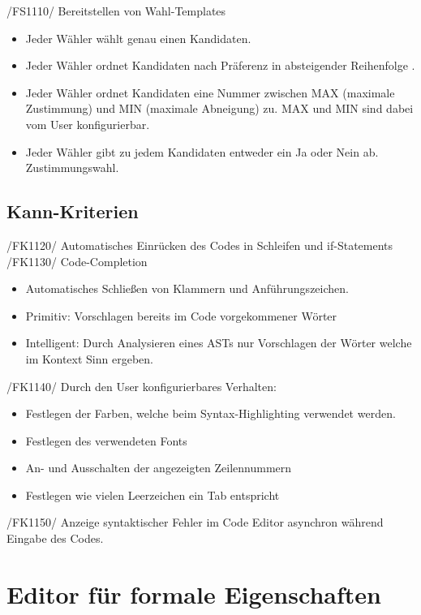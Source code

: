 \documentclass[a4paper]{scrreprt}
\begin{document}
/FS1110/ Bereitstellen von Wahl-Templates
\begin{itemize}
\item Jeder Wähler wählt genau einen Kandidaten.
\item Jeder Wähler ordnet Kandidaten nach Präferenz in absteigender Reihenfolge .
\item Jeder Wähler ordnet Kandidaten eine Nummer zwischen MAX (maximale Zustimmung) und MIN (maximale Abneigung) zu. MAX und MIN sind dabei vom User konfigurierbar. 
\item Jeder Wähler gibt zu jedem Kandidaten entweder ein Ja oder Nein ab. Zustimmungswahl.
\end{itemize}

\subsection{Kann-Kriterien}
/FK1120/ Automatisches Einrücken des Codes in Schleifen und if-Statements \\
/FK1130/ Code-Completion
\begin{itemize}
\item Automatisches Schließen von Klammern und Anführungszeichen.
\item Primitiv: Vorschlagen bereits im Code vorgekommener Wörter
\item Intelligent: Durch Analysieren eines ASTs nur Vorschlagen der Wörter welche im Kontext Sinn ergeben.
\end{itemize}

/FK1140/ Durch den User konfigurierbares Verhalten:
\begin{itemize}
\item Festlegen der Farben, welche beim Syntax-Highlighting verwendet werden.
\item Festlegen des verwendeten Fonts
\item An- und Ausschalten der angezeigten Zeilennummern
\item Festlegen wie vielen Leerzeichen ein Tab entspricht
\end{itemize}
/FK1150/ Anzeige syntaktischer Fehler im Code Editor asynchron während Eingabe des Codes.
 
	\section{Editor für formale Eigenschaften}
\end{document}
